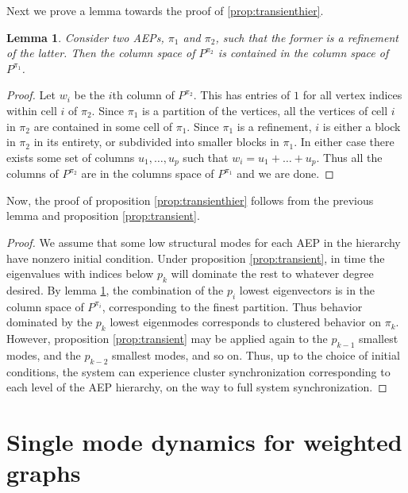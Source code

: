 \documentclass[%
 aip,
 amsmath,amssymb,
preprint,
reprint, onecolumn %
]{revtex4-1}
\newtheorem{lemma}[theorem]{Lemma}
\begin{document}
Next we prove a lemma towards the proof of \ref{prop:transienthier}.

\begin{lemma}\label{lem:refinement}
    Consider two AEPs, $\pi_1$ and $\pi_2$, such that the former is a refinement of the latter. Then the column space of $P^{\pi_2}$ is contained in the column space of $P^{\pi_1}$.
\end{lemma}

\begin{proof}
    Let $w_i$ be the $i$th column of $P^{\pi_2}$. This has entries of $1$ for all vertex indices within cell $i$ of $\pi_2$. Since $\pi_1$ is a partition of the vertices, all the vertices of cell $i$ in $\pi_2$ are contained in some cell of $\pi_1$. Since $\pi_1$ is a refinement, $i$ is either a block in $\pi_2$ in its entirety, or subdivided into smaller blocks in $\pi_1$. In either case there exists some set of columns $u_1,\dotsc, u_p$ such that $w_i = u_1 + \dots + u_p$. Thus all the columns of $P^{\pi_2}$ are in the columns space of $P^{\pi_1}$ and we are done.
\end{proof}


Now, the proof of proposition \ref{prop:transienthier} follows from the previous lemma and proposition \ref{prop:transient}.

\begin{proof}
    We assume that some low structural modes for each AEP in the hierarchy have nonzero initial condition. Under proposition \ref{prop:transient}, in time the eigenvalues with indices below $p_k$ will dominate the rest to whatever degree desired. By lemma \ref{lem:refinement}, the combination of the $p_i$ lowest eigenvectors is in the column space of $P^{\pi_i}$, corresponding to the finest partition. Thus behavior dominated by the $p_k$ lowest eigenmodes corresponds to clustered behavior on $\pi_k$. However, proposition \ref{prop:transient} may be applied again to the $p_{k-1}$ smallest modes, and the $p_{k-2}$ smallest modes, and so on. Thus, up to the choice of initial conditions, the system can experience cluster synchronization corresponding to each level of the AEP hierarchy, on the way to full system synchronization.
\end{proof}





\section{Single mode dynamics for weighted graphs}\label{sec:singlemodeweight}
\end{document}
